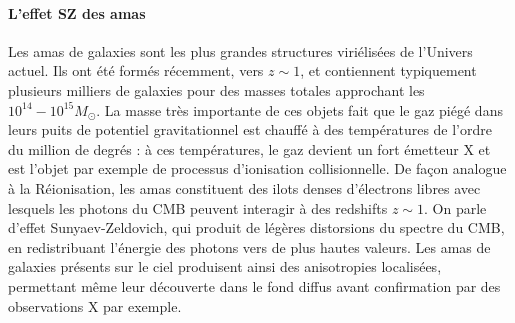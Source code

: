 \paragraph{L'effet SZ des amas}
Les amas de galaxies sont les plus grandes structures viriélisées de l'Univers actuel. Ils ont été formés récemment, vers $z\sim 1$, et contiennent typiquement plusieurs milliers de galaxies pour des masses totales approchant les $10^{14}-10^{15} M_\odot$. La masse très importante de ces objets fait que le gaz piégé dans leurs puits de potentiel gravitationnel est chauffé à des températures de l'ordre du million de degrés : à ces températures, le gaz devient un fort émetteur X et est l'objet par exemple de processus d'ionisation collisionnelle. De façon analogue à la Réionisation, les amas constituent des ilots denses d'électrons libres avec lesquels les photons du CMB peuvent interagir à des redshifts $z\sim 1$. On parle d'effet Sunyaev-Zeldovich, qui produit de légères distorsions du spectre du CMB, en redistribuant l'énergie des photons vers de plus hautes valeurs. Les amas de galaxies présents sur le ciel produisent ainsi des anisotropies localisées, permettant même leur découverte dans le fond diffus avant confirmation par des observations X par exemple.

